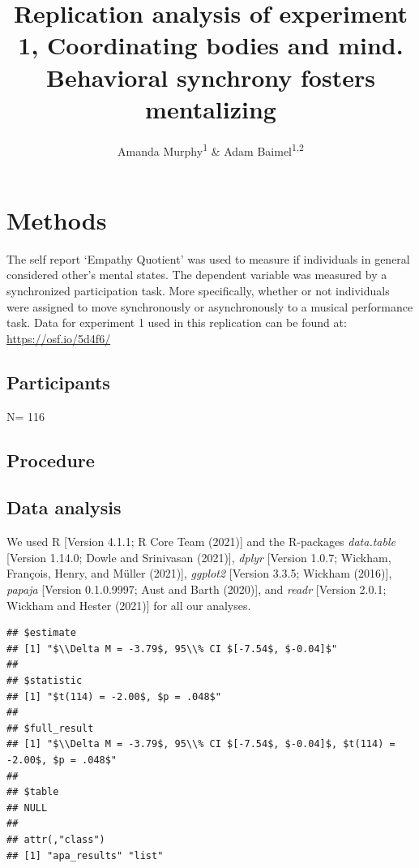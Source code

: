 \documentclass[
  english,
  man,floatsintext]{apa6}
\title{Replication analysis of experiment 1, Coordinating bodies and mind. Behavioral synchrony fosters mentalizing}
\author{Amanda Murphy\textsuperscript{1} \& Adam Baimel\textsuperscript{1,2}}
\date{}
\affiliation{\vspace{0.5cm}\textsuperscript{1} Brooklyn College CUNY\\\textsuperscript{2} The University of British Columbia}
\begin{document}
\maketitle

\hypertarget{methods}{%
\section{Methods}\label{methods}}

The self report `Empathy Quotient' was used to measure if individuals in general considered other's mental states. The dependent variable was measured by a synchronized participation task. More specifically, whether or not individuals were assigned to move synchronously or asynchronously to a musical performance task. Data for experiment 1 used in this replication can be found at:
\url{https://osf.io/5d4f6/}

\hypertarget{participants}{%
\subsection{Participants}\label{participants}}

N= 116

\hypertarget{procedure}{%
\subsection{Procedure}\label{procedure}}

\hypertarget{data-analysis}{%
\subsection{Data analysis}\label{data-analysis}}

We used R {[}Version 4.1.1; R Core Team (2021){]} and the R-packages \emph{data.table} {[}Version 1.14.0; Dowle and Srinivasan (2021){]}, \emph{dplyr} {[}Version 1.0.7; Wickham, François, Henry, and Müller (2021){]}, \emph{ggplot2} {[}Version 3.3.5; Wickham (2016){]}, \emph{papaja} {[}Version 0.1.0.9997; Aust and Barth (2020){]}, and \emph{readr} {[}Version 2.0.1; Wickham and Hester (2021){]} for all our analyses.

\begin{verbatim}
## $estimate
## [1] "$\\Delta M = -3.79$, 95\\% CI $[-7.54$, $-0.04]$"
## 
## $statistic
## [1] "$t(114) = -2.00$, $p = .048$"
## 
## $full_result
## [1] "$\\Delta M = -3.79$, 95\\% CI $[-7.54$, $-0.04]$, $t(114) = -2.00$, $p = .048$"
## 
## $table
## NULL
## 
## attr(,"class")
## [1] "apa_results" "list"
\end{verbatim}
\end{document}
